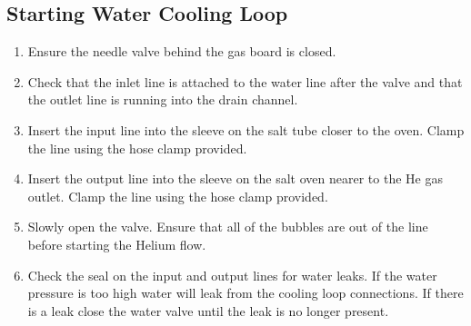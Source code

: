\subsection{Starting Water Cooling Loop}
\begin{enumerate}
\item \CheckBox[name=cloop1]{} Ensure the needle valve behind the gas board is closed.
\item \CheckBox[name=cloop2]{} Check that the inlet line is attached to the water line after the valve and that the outlet line is running into the drain channel.
\item \CheckBox[name=cloop3]{} Insert the input line into the sleeve on the salt tube closer to the oven. Clamp the line using the hose clamp provided.
\item \CheckBox[name=cloop4]{} Insert the output line into the sleeve on the salt oven nearer to the He gas outlet. Clamp the line using the hose clamp provided.
\item \CheckBox[name=cloop5]{} Slowly open the valve. Ensure that all of the bubbles are out of the line before starting the Helium flow.
\item \CheckBox[name=cloop6]{} Check the seal on the input and output lines for water leaks. If the water pressure is too high water will leak from the cooling loop connections. If there is a leak close the water valve until the leak is no longer present.
\end{enumerate}


